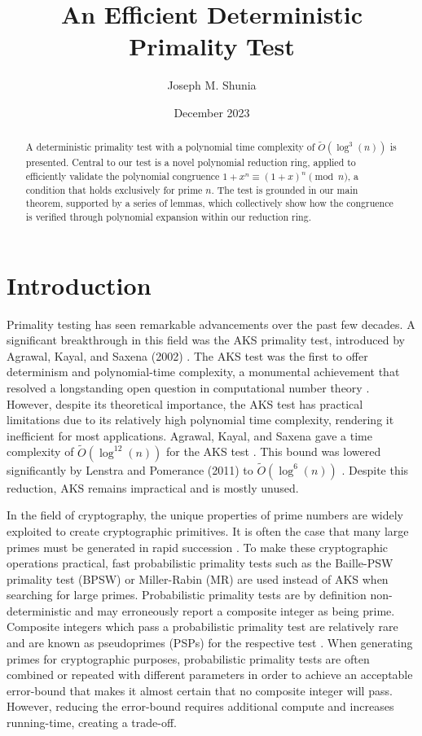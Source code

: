 \documentclass{article}
\title{An Efficient Deterministic Primality Test}
\author{Joseph M. Shunia}
\date{December 2023}
\theoremstyle{plain}
\theoremstyle{definition}
\begin{document}
\maketitle

\begin{abstract}
A deterministic primality test with a polynomial time complexity of $\tilde{O}(\log^3(n))$ is presented. Central to our test is a novel polynomial reduction ring, applied to efficiently validate the polynomial congruence $1 + x^n \equiv (1 + x)^n \pmod{n}$, a condition that holds exclusively for prime $n$. The test is grounded in our main theorem, supported by a series of lemmas, which collectively show how the congruence is verified through polynomial expansion within our reduction ring.
\end{abstract}

\section{Introduction}

Primality testing has seen remarkable advancements over the past few decades. A significant breakthrough in this field was the AKS primality test, introduced by Agrawal, Kayal, and Saxena (2002) \cite{aks2002}. The AKS test was the first to offer determinism and polynomial-time complexity, a monumental achievement that resolved a longstanding open question in computational number theory \cite{goldreich2008}. However, despite its theoretical importance, the AKS test has practical limitations due to its relatively high polynomial time complexity, rendering it inefficient for most applications. Agrawal, Kayal, and Saxena gave a time complexity of $\tilde{O}(\log^{12}(n))$ for the AKS test \cite{aks2002}. This bound was lowered significantly by Lenstra and Pomerance (2011) to $\tilde{O}(\log^6(n))$ \cite{lenstra2011}. Despite this reduction, AKS remains impractical and is mostly unused.

In the field of cryptography, the unique properties of prime numbers are widely exploited to create cryptographic primitives. It is often the case that many large primes must be generated in rapid succession \cite{lenstra1987}. To make these cryptographic operations practical, fast probabilistic primality tests such as the Baille-PSW primality test (BPSW) \cite{baillie1980} or Miller-Rabin (MR) \cite{rabin1980} \cite{miller1976} are used instead of AKS when searching for large primes. Probabilistic primality tests are by definition non-deterministic and may erroneously report a composite integer as being prime. Composite integers which pass a probabilistic primality test are relatively rare and are known as pseudoprimes (PSPs) for the respective test \cite{wagstaff1983}. When generating primes for cryptographic purposes, probabilistic primality tests are often combined or repeated with different parameters in order to achieve an acceptable error-bound that makes it almost certain that no composite integer will pass. However, reducing the error-bound requires additional compute and increases running-time, creating a trade-off.
\end{document}
